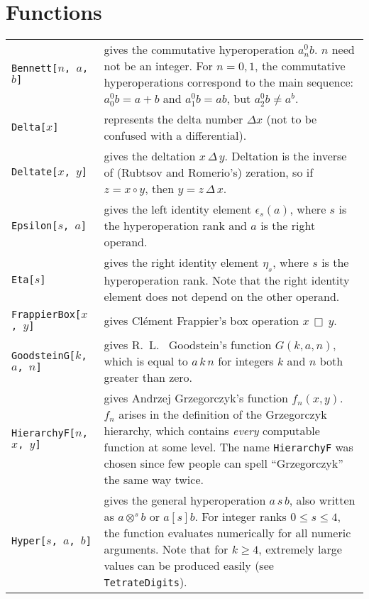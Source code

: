 \documentclass[letterpaper]{article}
\begin{document}
\section{Functions}
\begin{longtable}{p{1.5in}p{3.5in}}

\verb|Bennett[|$n$\verb|, |$a$\verb|, |$b$\verb|]| & gives the commutative hyperoperation $a^0_nb$. $n$ need not be an integer.  For $n = 0, 1$, the commutative hyperoperations correspond to the main sequence: $a^0_0b = a + b$ and $a^0_1b = ab$, but  $a^0_2b \neq a^b$. \\[6pt]

\verb|Delta[|$x$\verb|]| & represents the delta number $\Delta x$ (not to be confused with a differential). \\[6pt]

\verb|Deltate[|$x$\verb|, |$y$\verb|]| & gives the deltation $x \,\Delta\, y$.  Deltation is the inverse of (Rubtsov and Romerio's) zeration,  so if \mbox{$z = x \circ y$}, then $y = z \,\Delta\, x$. \\[6pt]

\verb|Epsilon[|$s$\verb|, |$a$\verb|]| & gives the left identity element $\epsilon_s(a)$, where $s$ is the hyperoperation rank and $a$ is the right operand. \\[6pt]

\verb|Eta[|$s$\verb|]| & gives the right identity element $\eta_s$, where $s$ is the hyperoperation rank.  Note that the right identity element does not depend on the other operand. \\[6pt]

\verb|FrappierBox[|$x$\verb|, |$y$\verb|]| & gives Cl\'ement Frappier's box operation $x \,\Box\, y$. \\[6pt]

\verb|GoodsteinG[|$k$\verb|, |$a$\verb|, |$n$\verb|]| & gives R.~L.~ Goodstein's function $G(k, a, n)$, which is equal to $a \,\boxed{k}\, n$ for integers $k$ and $n$ both greater than zero. \\[6pt]

\verb|HierarchyF[|$n$\verb|, |$x$\verb|, |$y$\verb|]| & gives Andrzej Grzegorczyk's function $f_n(x, y)$.  $f_n$ arises in the definition of the Grzegorczyk hierarchy, which contains \emph{every} computable function at some level.  The name \verb|HierarchyF| was chosen since few people can spell ``Grzegorczyk'' the same way twice. \\[6pt]

\verb|Hyper[|$s$\verb|, |$a$\verb|, |$b$\verb|]| & gives the general hyperoperation $a \,\boxed{s}\, b$, also written as $a \otimes^s b$ or $a [s] b$.  For integer ranks $0 \leq s \leq 4$, the function evaluates numerically for all numeric arguments.  Note that for $k \geq 4$, extremely large values can be produced easily (see \verb|TetrateDigits|). \\[6pt]


\end{longtable}
\end{document}
